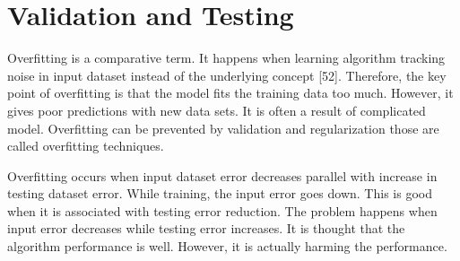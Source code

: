 \begin{table}[]
\caption{Hyper-parameters tuning}
\label{tab:xg_hyper}
\end{table}

\section{Validation and Testing}
Overfitting is a comparative term. It happens when learning algorithm tracking noise in input dataset instead of the underlying concept [52]. Therefore, the key point of overfitting is that the model fits the training data too much. However, it gives poor predictions with new data sets. It is often a result of complicated model. Overfitting can be prevented by validation and regularization those are called overfitting techniques. 

Overfitting occurs when input dataset error decreases parallel with increase in testing dataset error. While training, the input error goes down. This is good when it is associated with testing error reduction.  The problem happens when input error decreases while testing error increases. It is thought that the algorithm performance is well. However, it is actually harming the performance.

